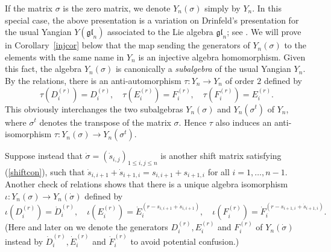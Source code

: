 \documentclass[twoside,12pt,reqno]{amsart}
\begin{document}
If the matrix $\sigma$ is the zero matrix,
we denote $Y_n(\sigma)$ simply by $Y_n$.
In this special case, the above presentation
is a variation on Drinfeld's presentation \cite{D3}
for the usual Yangian $Y(\mathfrak{gl}_n)$ 
associated to the Lie algebra 
$\mathfrak{gl}_n$; see 
\cite[Remark 5.12]{BK}.
We will prove in Corollary~\ref{injcor} below that
the map sending
the generators of $Y_n(\sigma)$ to the elements with the
same name in $Y_n$ is an injective algebra homomorphism. Given this fact,
the algebra $Y_n(\sigma)$ is canonically a {\em subalgebra}
of the usual Yangian $Y_n$. 
By the relations, there is an anti-automorphism 
$\tau:Y_n \rightarrow Y_n$ of order $2$ defined by
\begin{equation}\label{taudef}
\tau(D_i^{(r)}) = D_i^{(r)},\quad
\tau(E_i^{(r)}) = F_i^{(r)},\quad
\tau(F_i^{(r)}) = E_i^{(r)}.
\end{equation}
This obviously interchanges the two subalgebras
$Y_n(\sigma)$ and $Y_n(\sigma^t)$ of $Y_n$, where
$\sigma^t$ denotes the transpose of the matrix $\sigma$.
Hence $\tau$ also induces an anti-isomorphism
$\tau:Y_n(\sigma) \rightarrow Y_n(\sigma^t)$.
\iffalse
Another natural automorphism of $Y_n$ is
$\gamma:Y_n \rightarrow Y_n$ defined on
generators by
\begin{align}\label{gammadef1}
\gamma(D_i^{(r)}) &= (-1)^{(r-1)}\widetilde D_{n+1-i}^{(r)},\\
\gamma(E_i^{(r)}) &= (-1)^{(r-1)}F_{n-i}^{(r)},\\
\gamma(F_i^{(r)}) &= (-1)^{(r-1)}E_{n-i}^{(r)}.
\end{align}
\fi
Suppose instead that
$\dot\sigma = (\dot s_{i,j})_{1 \leq i,j \leq n}$ is another shift matrix
satisfying (\ref{shiftcon}),
such that $\dot s_{i,i+1}+\dot s_{i+1,i}= s_{i,i+1}+s_{i+1,i}$
for all $i=1,\dots,n-1$.
Another check of relations 
shows that there is a unique algebra isomorphism
$\iota:Y_n(\sigma) \rightarrow Y_n({\dot{\sigma}})$
defined by 
\begin{equation}\label{iotadef}
\iota(D_i^{(r)}) = \dot{D}_i^{(r)},\quad
\iota(E_i^{(r)}) = \dot{E}_i^{(r-s_{i,i+1}+\dot s_{i,i+1})},\quad
\iota(F_i^{(r)}) = \dot{F}_i^{(r-s_{i+1,i}+\dot s_{i+1,i})}.
\end{equation}
(Here and later on we denote the generators 
$D_i^{(r)}, E_i^{(r)}$ and $F_i^{(r)}$
of $Y_n(\dot\sigma)$
instead by $\dot{D}_i^{(r)}, \dot{E}_i^{(r)}$
and $\dot{F}_i^{(r)}$ to avoid potential confusion.)
\end{document}
